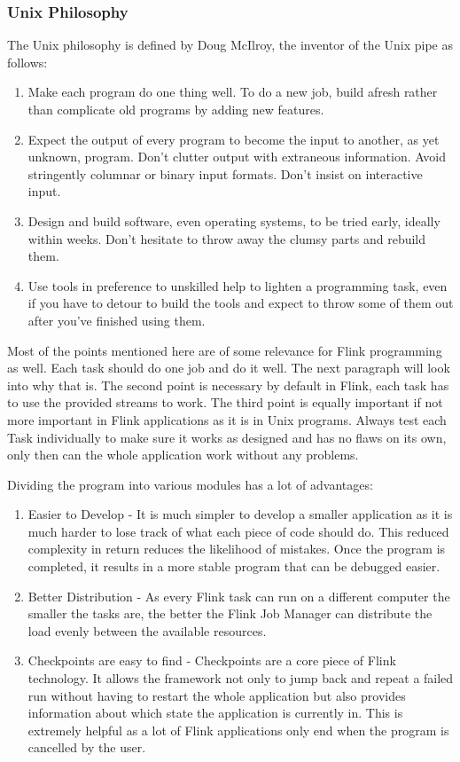 \subsubsection{Unix Philosophy}
The Unix philosophy is defined by Doug McIlroy, the inventor of the Unix pipe as follows: \cite{bell1978}
\begin{enumerate}
  \item Make each program do one thing well. To do a new job, build afresh rather than complicate old programs by adding new features.
  \item Expect the output of every program to become the input to another, as yet unknown, program. Don't clutter output with extraneous information. Avoid stringently columnar or binary input formats. Don't insist on interactive input.
  \item Design and build software, even operating systems, to be tried early, ideally within weeks. Don't hesitate to throw away the clumsy parts and rebuild them.
  \item Use tools in preference to unskilled help to lighten a programming task, even if you have to detour to build the tools and expect to throw some of them out after you've finished using them.
\end{enumerate}

Most of the points mentioned here are of some relevance for Flink programming as well. Each task should do one job and do it well. The next paragraph will look into why that is. The second point is necessary by default in Flink, each task has to use the provided streams to work. The third point is equally important if not more important in Flink applications as it is in Unix programs. Always test each Task individually to make sure it works as designed and has no flaws on its own, only then can the whole application work without any problems.

Dividing the program into various modules has a lot of advantages:
\begin{enumerate}
  \item Easier to Develop - It is much simpler to develop a smaller application as it is much harder to lose track of what each piece of code should do. This reduced complexity in return reduces the likelihood of mistakes. Once the program is completed, it results in a more stable program that can be debugged easier.
  \item Better Distribution -  As every Flink task can run on a different computer the smaller the tasks are, the better the Flink Job Manager can distribute the load evenly between the available resources.
  \item Checkpoints are easy to find - Checkpoints are a core piece of Flink technology. It allows the framework not only to jump back and repeat a failed run without having to restart the whole application but also provides information about which state the application is currently in. This is extremely helpful as a lot of Flink applications only end when the program is cancelled by the user.
\end{enumerate}

